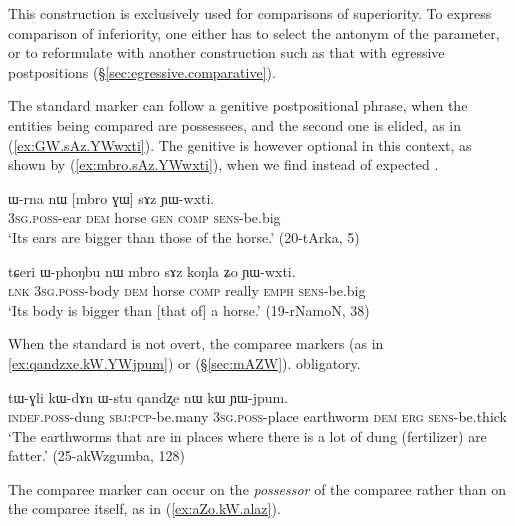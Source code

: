 This construction is exclusively used for comparisons of superiority. To express comparison of inferiority, one either has to select the antonym of the parameter, or to reformulate with another construction such as that with egressive postpositions (§\ref{sec:egressive.comparative}).

The standard marker can follow a genitive postpositional phrase, when the entities being compared are possessees, and the second one is elided, as in (\ref{ex:GW.sAz.YWwxti}). The genitive is however optional in this context, as shown by (\ref{ex:mbro.sAz.YWwxti}), when we find  instead of expected .

\begin{exe}
\ex \label{ex:GW.sAz.YWwxti}
\gll  ɯ-rna nɯ [mbro ɣɯ] sɤz ɲɯ-wxti. \\
\textsc{3sg}.\textsc{poss}-ear \textsc{dem} horse \textsc{gen} \textsc{comp} \textsc{sens}-be.big \\
\glt `Its ears are bigger than those of the horse.' (20-tArka, 5)
\end{exe}

\begin{exe}
\ex \label{ex:mbro.sAz.YWwxti}
\gll  tɕeri ɯ-phoŋbu nɯ mbro sɤz koŋla ʑo ɲɯ-wxti. \\
\textsc{lnk} \textsc{3sg}.\textsc{poss}-body \textsc{dem} horse \textsc{comp} really \textsc{emph} \textsc{sens}-be.big \\
\glt `Its body is bigger than [that of] a horse.' (19-rNamoN, 38)
\end{exe}

When the standard is not overt, the comparee markers  (as in \ref{ex:qandzxe.kW.YWjpum}) or  (§\ref{sec:mAZW}). obligatory.

\begin{exe}
\ex \label{ex:qandzxe.kW.YWjpum}
\gll tɯ-ɣli kɯ-dɤn ɯ-stu qandʐe nɯ kɯ ɲɯ-jpum. \\
\textsc{indef}.\textsc{poss}-dung \textsc{sbj}:\textsc{pcp}-be.many \textsc{3sg}.\textsc{poss}-place earthworm \textsc{dem} \textsc{erg} \textsc{sens}-be.thick \\
\glt `The earthworms that are in places where there is a lot of dung (fertilizer) are fatter.' (25-akWzgumba, 128)
\end{exe}

The comparee marker  can occur on the \textit{possessor} of the comparee rather than on the comparee itself, as in (\ref{ex:aZo.kW.alaz}).

